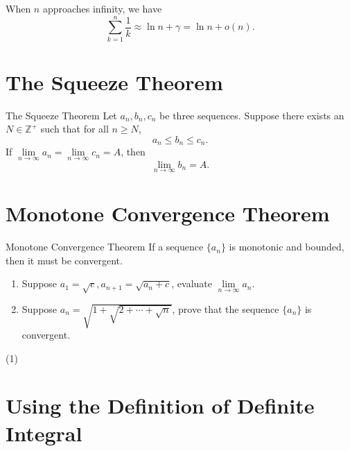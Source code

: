 \begin{corollary}{}{}
  When $n$ approaches infinity, we have
  \begin{equation}
    \sum\limits_{k = 1}^n \frac{1}{k} \approx \ln n + \gamma = \ln n + o(n).
  \end{equation}
\end{corollary}

\section{The Squeeze Theorem}

\begin{theorem}{The Squeeze Theorem}{}
  Let $a_n, b_n, c_n$ be three sequences.
  Suppose there exists an $N \in \mathbb{Z}^+$ such that for all $n \geq N$,
  \begin{equation}
    a_n \leq b_n \leq c_n.
  \end{equation}
  If $\lim \limits _{n \rightarrow \infty} a_n = \lim \limits _{n \rightarrow
    \infty} c_n = A$,
  then 
  \begin{equation}
    \lim \limits _{n \rightarrow \infty} b_n = A.
  \end{equation}
\end{theorem}

\section{Monotone Convergence Theorem}

\begin{theorem}{Monotone Convergence Theorem}{}
  If a sequence $\{a_n\}$ is monotonic and bounded,
  then it must be convergent.
\end{theorem}

\begin{example}{}{}
  \begin{enumerate}
  \item Suppose $a_1 = \sqrt{c}, a_{n+1} = \sqrt{a_n + c}$, evaluate $\lim \limits _{n \rightarrow \infty} a_n$.
  \item Suppose $a_n = \sqrt{1 + \sqrt{2 + \cdots + \sqrt{n}}}$,
    prove that the sequence $\{a_n\}$ is convergent.
  \end{enumerate}
\end{example}

\begin{solution}
  (1)
\end{solution}

\section{Using the Definition of Definite Integral}


